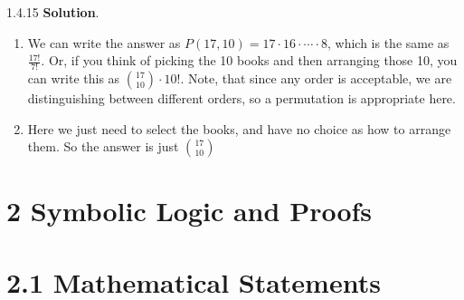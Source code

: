 \documentclass[11pt,]{book}
\theoremstyle{ptxplainnotitle}
\theoremstyle{ptxplaintitle}
\theoremstyle{ptxdefinitionnotitle}
\theoremstyle{ptxdefinitiontitle}
\theoremstyle{ptxdefinitionnotitle}
\theoremstyle{ptxdefinitiontitle}
\theoremstyle{ptxdefinitionnotitle}
\theoremstyle{ptxdefinitiontitle}
\theoremstyle{ptxdefinitiontitlenonumber}
\theoremstyle{ptxdefinitiontitlenonumber}
\numberwithin{equation}{chapter}
\begin{document}
\begin{divisionexercise}{1.4.15}
\textbf{Solution}.\quad%
\hypertarget{p-1768}{}%
\leavevmode%
\begin{enumerate}[label=\alph*.]
\item\hypertarget{li-749}{}\hypertarget{p-1769}{}%
We can write the answer as \(P(17,10) = 17 \cdot 16 \cdot \cdots \cdot 8\text{,}\) which is the same as \(\frac{17!}{7!}\text{.}\)  Or, if you think of picking the 10 books and then arranging those 10, you can write this as \(\binom{17}{10}\cdot 10!\text{.}\)  Note, that since any order is acceptable, we are distinguishing between different orders, so a permutation is appropriate here.%
\item\hypertarget{li-750}{}\hypertarget{p-1770}{}%
Here we just need to select the books, and have no choice as how to arrange them.  So the answer is just \(\binom{17}{10}\)%
\end{enumerate}
%
\end{divisionexercise}%
\section*{2 Symbolic Logic and Proofs}
\section*{2.1 Mathematical Statements}
\end{document}
